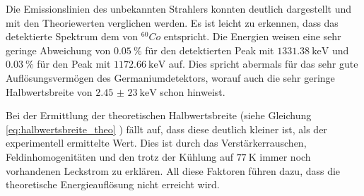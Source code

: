Die Emissionslinien des unbekannten Strahlers konnten deutlich dargestellt und
mit den Theoriewerten verglichen werden. Es ist leicht zu erkennen, dass das
detektierte Spektrum dem von $^{60}Co$ entspricht. Die Energien weisen eine
sehr geringe Abweichung von $\SI{0,05}{\percent}$ für den detektierten Peak mit
$\SI{1331,38}{\kilo \electronvolt}$ und $\SI{0,03}{\percent}$ für den Peak mit
$\SI{1172,66}{\kilo \electronvolt}$ auf. Dies spricht abermals für das sehr gute
Auflösungsvermögen des Germaniumdetektors, worauf auch die sehr geringe Halbwertsbreite von $\SI{2,45(23)}{\kilo \electronvolt}$ schon hinweist.

\noindent Bei der Ermittlung der theoretischen Halbwertsbreite
(siehe Gleichung \ref{eq:halbwertsbreite_theo} ) fällt auf, dass diese deutlich kleiner ist, als
der experimentell ermittelte Wert. Dies ist durch das Verstärkerrauschen, Feldinhomogenitäten und den trotz der Kühlung auf $\SI{77}{\kelvin}$ immer noch vorhandenen Leckstrom zu erklären.
All diese Faktoren führen dazu, dass die theoretische Energieauflösung nicht erreicht wird.


\printbibliography
